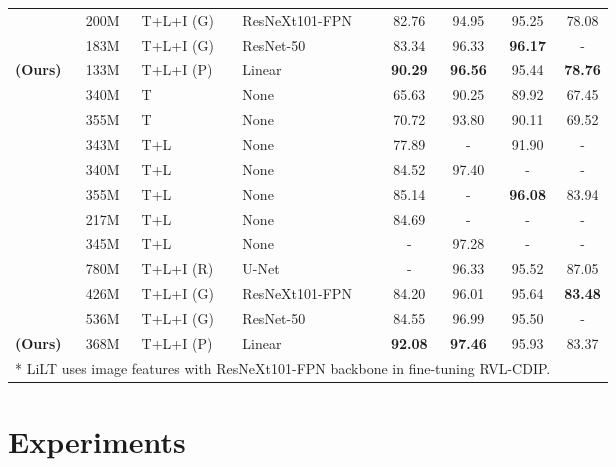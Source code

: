 \documentclass[sigconf]{acmart}
\newcommand{\demph}[1]{\textcolor{demphcolor}{#1}}
\begin{document}
\begin{table*}[t]
\begin{tabular}{llllcccc}
     ~\cite{xu-etal-2021-layoutlmv2} & 200M & T+L+I (G) & ResNeXt101-FPN & 82.76 & 94.95 & 95.25 & 78.08\\
     ~\cite{Appalaraju_2021_ICCV} & 183M & T+L+I (G) & ResNet-50 & 83.34 & 96.33 & \textbf{96.17} & - \\
     \bf  (Ours) & 133M & T+L+I (P) & Linear & \textbf{90.29} & \textbf{96.56} & 95.44 & \textbf{78.76} \\
     \midrule
     ~\cite{devlin2019bert} & 340M & T& None & 65.63 & 90.25 & 89.92 & 67.45\\
     ~\cite{liu2019roberta} & 355M & T& None & 70.72 & 93.80 &  90.11 & 69.52 \\
     ~\cite{xu2020layoutlm} & 343M & T+L& None & 77.89 & - & 91.90 & - \\
     ~\cite{hong2022bros} & 340M & T+L& None & 84.52 & 97.40 &  - & -\\
     ~\cite{Li2021StructuralLMSP} & 355M & T+L& None & 85.14 & - & \textbf{96.08} & \demph{83.94} \\
     ~\cite{lee2022formnet} & 217M & T+L & None & 84.69 & - & - & - \\
     ~\cite{lee2022formnet} & 345M & T+L & None & - & 97.28 & - & - \\
     ~\cite{Powalski2021GoingFB} & 780M & T+L+I (R) & U-Net & - & 96.33 & 95.52 & \demph{87.05}\\
     ~\cite{xu-etal-2021-layoutlmv2} & 426M & T+L+I (G) & ResNeXt101-FPN & 84.20 & 96.01 & 95.64 & \textbf{83.48} \\
     ~\cite{Appalaraju_2021_ICCV} & 536M & T+L+I (G) & ResNet-50 & 84.55 & 96.99 & 95.50 & - \\
     \bf  (Ours) & 368M & T+L+I (P) & Linear & \textbf{92.08} & \textbf{97.46} & {95.93} & 83.37 \\
     \bottomrule
    \multicolumn{7}{l}{\footnotesize 
    * LiLT uses image features with ResNeXt101-FPN backbone in fine-tuning RVL-CDIP.
    }
    \end{tabular}
\end{table*}


\section{Experiments}
\end{document}

